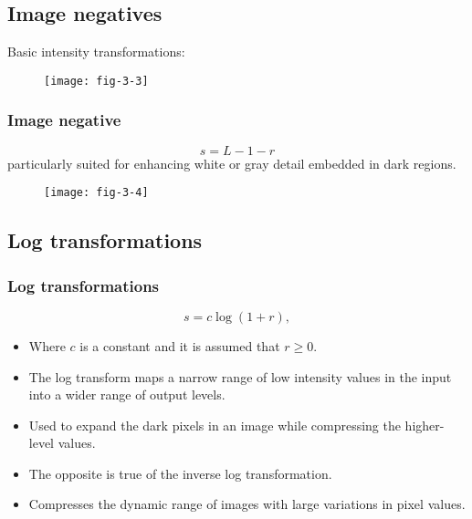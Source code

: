 \subsection{Image negatives}


\begin{frame}
Basic intensity transformations:
\begin{figure}
\centering
\texttt{[image: fig-3-3]}
\end{figure}
\end{frame}


\begin{frame}
\frametitle{Image negative}
\begin{equation}
s = L - 1 - r
\end{equation}
particularly suited for enhancing white or gray detail embedded in dark regions.
\begin{figure}
\centering
\texttt{[image: fig-3-4]}
\end{figure}
\end{frame}


\subsection{Log transformations}


\begin{frame}
\frametitle{Log transformations}
\begin{equation}
s=c\log(1+r),
\end{equation}
\begin{itemize}
\item Where $c$ is a constant and it is assumed that $r\geq 0$.
\item The log transform maps a narrow range of low intensity values in the input into a wider range of output levels.
\item Used to expand the dark pixels in an image while compressing the higher-level values.
\item The opposite is true of the inverse log transformation.
\item Compresses the dynamic range of images with large variations in
pixel values. 
\end{itemize}
\end{frame}

